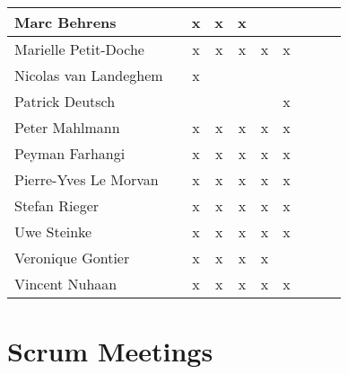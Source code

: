 \documentclass[a4paper, 11pt]{article}
\begin{document}
\begin{tabular}{|l|c|c|c||c|c|c||c|c|c|}
Marc Behrens         &   & x & x & x &  &  \\\hline
Marielle Petit-Doche &  &  x & x & x & x & x \\\hline
Nicolas van Landeghem&   & x &  &  &   &   \\\hline
Patrick Deutsch       &   &  &  &  &  & x \\\hline
Peter Mahlmann       &   & x & x & x & x & x \\\hline
Peyman Farhangi      &   & x  & x  & x & x  &  x \\\hline
Pierre-Yves Le Morvan&   & x & x & x & x  & x \\\hline
Stefan Rieger        &  & x & x & x & x & x \\\hline
Uwe Steinke          &  & x & x & x & x & x \\\hline
Veronique Gontier    &   & x & x & x & x &  \\\hline
Vincent Nuhaan      &   & x & x & x & x  & x  \\\hline
\end{tabular}


\section{Scrum Meetings}

\end{document}
